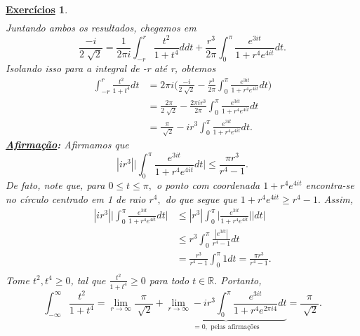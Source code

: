 \documentclass{article}
\newtheorem*{exer*}{\underline{Exerc\'icios}}
\begin{document}
\begin{exer*}
\begin{align*}
    \end{align*}
    Juntando ambos os resultados, chegamos em 
    \[
      \frac{-i}{2\sqrt[]{2}} = \frac{1}{2\pi i}\int_{-r}^{r}\frac{t^{2}}{1+t^{4}}ddt + \frac{r^{3}}{2\pi }\int_{0}^{\pi }\frac{e^{3it}}{1 + r^{4}e^{4it}}dt.
    \]
    Isolando isso para a integral de -r até r, obtemos
    \begin{align*}
      \int_{-r}^{r}\frac{t^{2}}{1+t^{4}}dt &= 2\pi i \biggl(\frac{-i}{2\sqrt[]{2}} - \frac{r^{3}}{2\pi }\int_{0}^{\pi }\frac{e^{3it}}{1 + r^{4}e^{4it}}dt\biggr)\\
                                           &= \frac{2\pi }{2\sqrt[]{2}} - \frac{2\pi ir^{3}}{2\pi }\int_{0}^{\pi }\frac{e^{3it}}{1 + r^{4}e^{4it}}dt\\
                                           &= \frac{\pi }{\sqrt[]{2}} - ir^{3}\int_{0}^{\pi }\frac{e^{3it}}{1+r^{4}e^{4it}}dt.
    \end{align*}
    \textbf{\underline{Afirmação}:} Afirmamos que 
    \[
      |ir^{3}|\biggl\vert \int_{0}^{\pi }\frac{e^{3it}}{1+ r^{4}e^{4it}}dt \biggr\vert \leq \frac{\pi r^{3}}{r^{4}-1}.
    \]
    De fato, note que, para \(0\leq t\leq \pi ,\) o ponto com coordenada \(1 + r^{4}e^{4it}\) encontra-se no círculo centrado em 1 de raio \(r^{4},\) do que
    segue que \(1 + r^{4}e^{4it} \geq r^{4}-1.\) Assim,
    \begin{align*}
      |ir^{3}|\biggl\vert \int_{0}^{\pi }\frac{e^{3it}}{1+r^{4}e^{4it}}dt \biggr\vert &\leq |r^{3}|\int_{0}^{\pi }\biggl\vert \frac{e^{3it}}{1+r^{4}e^{4it}} \biggr\vert|dt|\\
                                                                                      &\leq r^{3}\int_{0}^{\pi }\frac{|e^{3it}|}{r^{4}-1}dt\\
                                                                                      &= \frac{r^{3}}{r^{4}-1}\int_{0}^{\pi }1dt = \frac{\pi r^{3}}{r^{4} - 1}.\\
    \end{align*}
    Tome \(t^{2}, t^{4}\geq 0\), tal que \(\frac{t^{2}}{1 + t^{4}} \geq 0\) para todo \(t\in \mathbb{R}.\) Portanto,
    \[
      \int_{-\infty}^{\infty}\frac{t^{2}}{1+t^{4}}=\lim_{r\to \infty}\frac{\pi }{\sqrt[]{2}} + \underbrace{\lim_{r\to \infty}-ir^{3}\int_{0}^{\pi }\frac{e^{3it}}{1 + r^{4}e^{2\pi i4}}dt}_{= 0, \text{ pelas afirmações}} = \frac{\pi }{\sqrt[]{2}}.
    \]
  \end{exer*}
\end{document}
